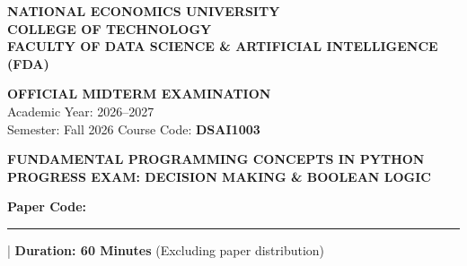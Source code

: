 \documentclass[11pt,a4paper]{article}
\begin{document}

\noindent
\begin{minipage}[t]{0.64\textwidth}
  \raggedright\small
  \textbf{NATIONAL ECONOMICS UNIVERSITY}\\
  \textbf{COLLEGE OF TECHNOLOGY}\\
  \textbf{FACULTY OF DATA SCIENCE \& ARTIFICIAL INTELLIGENCE (FDA)}
\end{minipage}%
\hfill
\begin{minipage}[t]{0.34\textwidth}
  \raggedleft\footnotesize
  \textbf{OFFICIAL MIDTERM EXAMINATION}\\
  Academic Year: 2026--2027\\
  Semester: Fall 2026 \quad Course Code: \textbf{DSAI1003}
\end{minipage}

\vspace{0.15em}

\begin{center}
  {\Large\bfseries\color{primaryblue} FUNDAMENTAL PROGRAMMING CONCEPTS IN PYTHON}\\[0.08em]
  {\normalsize\bfseries PROGRESS EXAM: DECISION MAKING \& BOOLEAN LOGIC}\\[0.08em]
  {\normalsize\textbf{Paper Code:} \rule{1.6cm}{0.4pt} \quad | \quad \textbf{Duration: 60 Minutes} (Excluding paper distribution)}
\end{center}

\vspace{0.05em}
\end{document}
